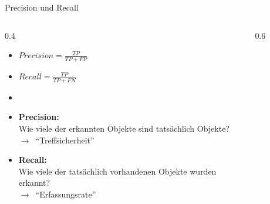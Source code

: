 \documentclass{beamer}
\begin{document}
\begin{frame}[shrink=8]{Precision und Recall}
  \begin{columns}
    \begin{column}{0.4\textwidth}
      \begin{itemize}
        \item \(Precision = \frac{TP}{TP + FP}\)
        \item \(Recall = \frac{TP}{TP + FN}\)
        \item[]

        \item<3->\textbf{Precision:}\\Wie viele der erkannten Objekte sind tatsächlich Objekte?\\\(\rightarrow\)~\enquote{Treffsicherheit}
        \item<4->\textbf{Recall:}\\Wie viele der tatsächlich vorhandenen Objekte wurden erkannt?\\\(\rightarrow\)~\enquote{Erfassungsrate}
      \end{itemize}
    \end{column}
    \begin{column}{0.6\textwidth}
      \begin{figure}
        \centering
      \end{figure}
    \end{column}
  \end{columns}
\end{frame}
\end{document}
